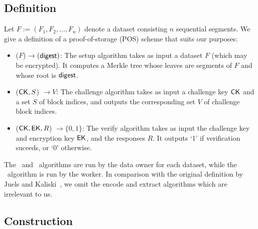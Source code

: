 \subsection{Definition} \label{sect:pos-definition}

Let $F := (F_1,F_2,\dotsc,F_n)$ denote a dataset consisting $n$ sequential segments.
We give a definition of a proof-of-storage (POS) scheme that suits our purposes:
\begin{itemize}

\item \Setup($F$) $\rightarrow (\textsf{\textup{digest}})$: The setup algorithm takes as input a dataset $F$ (which may be encrypted). It computes a Merkle tree whose leaves are segments of $F$ and whose root is $\textsf{\textup{digest}}$.

\item \Prove($\textsf{\textup{CK}}, S$) $\rightarrow V$: The challenge algorithm takes as input a challenge key $\textsf{\textup{CK}}$ and a set $S$ of block indices, and outputs the corresponding set $V$ of challenge block indices.

\item \Verify($\textsf{\textup{CK}}, \textsf{\textup{EK}}, R$) $\rightarrow \{0,1\}$: The verify algorithm takes as input the challenge key and encryption key $\textsf{\textup{EK}}$, and the responses $R$. It outputs `1' if verification suceeds, or `0' otherwise.
\end{itemize}

The \Setup~and \Verify~algorithms are run by the data owner for each dataset, while the \Prove~algorithm is run by the worker.
In comparison with the original definition by Juels and Kaliski~\cite{JK07}, we omit the encode and extract algorithms which are irrelevant to us.

\subsection{Construction} \label{sect:pos-construction}





